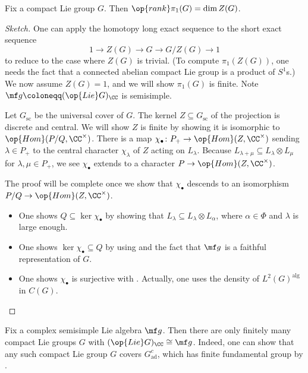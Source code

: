\documentclass{article}
\begin{document}
\begin{proposition} \label{prop:pi1-compact}
	Fix a compact Lie group $G$. Then $\op{rank}\pi_1(G)=\dim Z(G)$.
\end{proposition}
\begin{proof}[Sketch]
	One can apply the homotopy long exact sequence to the short exact sequence
	\[1\to Z(G)\to G\to G/Z(G)\to1\]
	to reduce to the case where $Z(G)$ is trivial. (To compute $\pi_1(Z(G))$, one needs the fact that a connected abelian compact Lie group is a product of $S^1$s.) We now assume $Z(G)=1$, and we will show $\pi_1(G)$ is finite. Note $\mf g\coloneqq(\op{Lie}G)_\CC$ is semisimple.

	Let $G_{\mathrm{sc}}$ be the universal cover of $G$. The kernel $Z\subseteq G_{\mathrm{sc}}$ of the projection is discrete and central. We will show $Z$ is finite by showing it is isomorphic to $\op{Hom}(P/Q,\CC^\times)$. There is a map $\chi_\bullet\colon P_+\to\op{Hom}(Z,\CC^\times)$ sending $\lambda\in P_+$ to the central character $\chi_\lambda$ of $Z$ acting on $L_\lambda$. Because $L_{\lambda+\mu}\subseteq L_\lambda\otimes L_\mu$ for $\lambda,\mu\in P_+$, we see $\chi_\bullet$ extends to a character $P\to\op{Hom}(Z,\CC^\times)$.

	The proof will be complete once we show that $\chi_\bullet$ descends to an isomorphism $P/Q\to\op{Hom}(Z,\CC^\times)$.
	\begin{itemize}
		\item One shows $Q\subseteq\ker\chi_\bullet$ by showing that $L_\lambda\subseteq L_\lambda\otimes L_\alpha$, where $\alpha\in\Phi$ and $\lambda$ is large enough.
		\item One shows $\ker\chi_\bullet\subseteq Q$ by using  and the fact that $\mf g$ is a faithful representation of $G$.
		\item One shows $\chi_\bullet$ is surjective with . Actually, one uses the density of $L^2(G)^{\mathrm{alg}}$ in $C(G)$.
		\qedhere
	\end{itemize}
\end{proof}
\begin{example}
	Fix a complex semisimple Lie algebra $\mf g$. Then there are only finitely many compact Lie groups $G$ with $(\op{Lie}G)_\CC\cong\mf g$. Indeed, one can show that any such compact Lie group $G$ covers $G_{\mathrm{ad}}^c$, which has finite fundamental group by .
\end{example}

\newpage
\appendix
\end{document}
